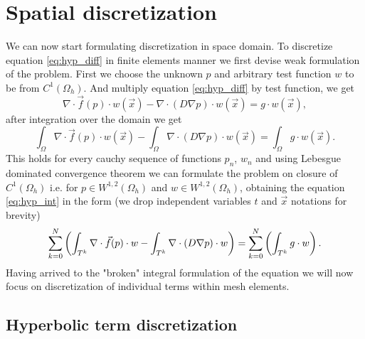 \section{Spatial discretization}
We can now start formulating discretization in space domain. To discretize 
equation \eqref{eq:hyp_diff} in finite elements manner we first devise weak 
formulation of the problem. First we choose the unknown $p$ and arbitrary test 
function $w$ to be from $C^1(\Omega_h)$. And multiply equation 
\eqref{eq:hyp_diff} by test function, we get
\begin{equation}
	\nabla\cdot \vec{f}(p)\cdot w(\vec{x}) 
	-  \nabla \cdot (D \nabla p)\cdot w( 
	\vec{x}) = g\cdot w(\vec{x}),
\end{equation}
after integration over the domain we get
\begin{equation}\label{eq:hyp_int}
	 \int_{\Omega}\nabla\cdot \vec{f}(p)\cdot w(\vec{x}) 
	 - \int_{\Omega}\nabla \cdot (D \nabla p)\cdot w(\vec{x}) 
	 = \int_{\Omega}g\cdot w(\vec{x}).
\end{equation}
This holds for every cauchy sequence of functions ${p_n}$, ${w_n}$ and using 
Lebesgue dominated convergence theorem we can formulate the problem on closure 
of $C^1(\Omega_h)$ i.e. for $p \in W^{1,2}(\Omega_h)$ and  $w \in 
W^{1,2}(\Omega_h)$, obtaining the equation \eqref{eq:hyp_int} in the form (we 
drop 
independent variables $t$ and $\vec{x}$ notations for brevity) 
\begin{equation}
	\label{eq:sum_int_hyp}
	\sum\limits_{k=0}^{N}\left(
	\int_{T^k}\nabla\cdot \vec{f}(p)\cdot w
	- \int_{T^k}\nabla \cdot (D \nabla p)\cdot w 
		\right)
 	=\sum\limits_{k=0}^{N}\left(\int_{T^k} g\cdot w\right).
\end{equation}
Having arrived to the "broken" integral formulation of the equation we will now 
focus on discretization of individual terms within mesh elements.

\subsection{Hyperbolic term discretization}
\label{se:hyp_term}

